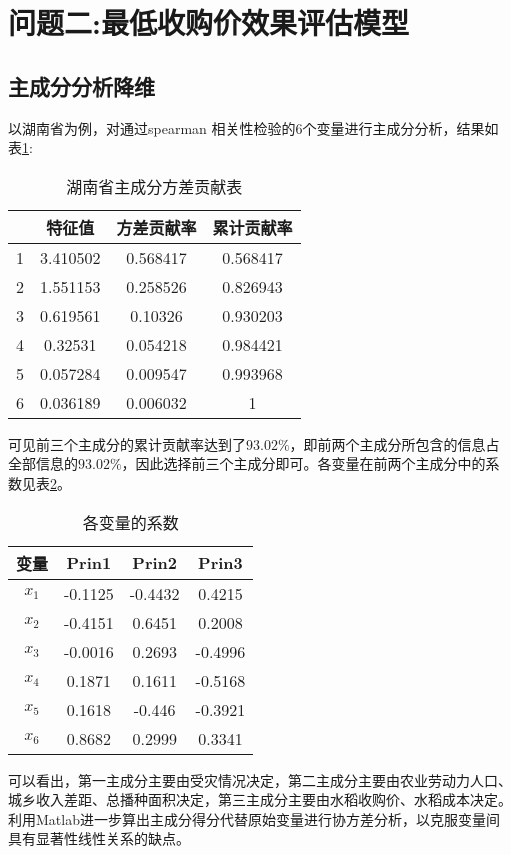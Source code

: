 \documentclass[withoutpreface,bwprint]{cumcmthesis} %
\begin{document}
		
		
		
		
	
		\section{问题二:最低收购价效果评估模型}
		\subsection{主成分分析降维}
以湖南省为例，对通过spearman 相关性检验的6个变量进行主成分分析，结果如表\ref{tab:hnfc}:\par
		\begin{table}[htbp]
		  \centering
		  \caption{湖南省主成分方差贡献表}
		    \begin{tabular}{cccc}
		    \toprule[2pt]
		   &特征值 & 方差贡献率 & 累计贡献率\\
		    \midrule[1.5pt]
		  1 & 3.410502 & 0.568417 & 0.568417 \\
		  2 & 1.551153 & 0.258526 & 0.826943 \\
		  3 & 0.619561 & 0.10326 & 0.930203 \\
		  4 & 0.32531 & 0.054218 & 0.984421 \\
		  5 & 0.057284 & 0.009547 & 0.993968 \\
		  6 & 0.036189 & 0.006032 & 1 \\
		    \bottomrule[2pt]
		    \end{tabular}%
		  \label{tab:hnfc}%
		\end{table}%
可见前三个主成分的累计贡献率达到了$93.02\%$，即前两个主成分所包含的信息占全部信息的$93.02\%$，因此选择前三个主成分即可。各变量在前两个主成分中的系数见表\ref{tab:blxs}。\par
		\begin{table}[htbp]
		  \centering
		  \caption{各变量的系数}
		    \begin{tabular}{cccc}
		    \toprule[2pt]
		 变量  &Prin1 & Prin2 & Prin3\\
		    \midrule[1.5pt]		    
		 $x_1$  & -0.1125 & -0.4432 & 0.4215 \\
		 $x_2$ & -0.4151 & 0.6451 & 0.2008 \\
		 $x_3$ & -0.0016 & 0.2693 & -0.4996 \\
		 $x_4$  & 0.1871 & 0.1611 & -0.5168 \\
		 $x_5$  & 0.1618 & -0.446 & -0.3921 \\
		 $x_6$ & 0.8682 & 0.2999 & 0.3341 \\
		    \bottomrule[2pt]
		    \end{tabular}%
		  \label{tab:blxs}%
		\end{table}%
可以看出，第一主成分主要由受灾情况决定，第二主成分主要由农业劳动力人口、城乡收入差距、总播种面积决定，第三主成分主要由水稻收购价、水稻成本决定。利用Matlab进一步算出主成分得分代替原始变量进行协方差分析，以克服变量间具有显著性线性关系的缺点。
\end{document}
